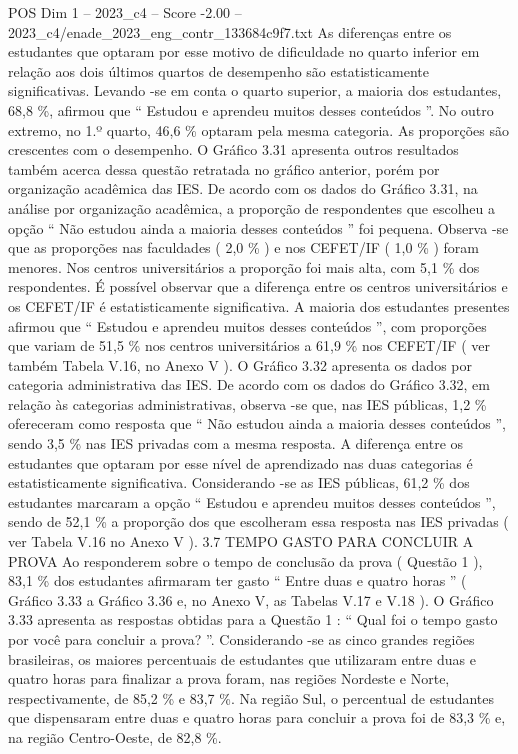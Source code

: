 \begin{textsample}{POS Dim 1 – 2023\_c4 – Score -2.00 – 2023\_c4/enade\_2023\_eng\_contr\_133684c9f7.txt}
As diferenças entre os estudantes que optaram por esse motivo de dificuldade no quarto inferior em relação aos dois últimos quartos de desempenho são estatisticamente significativas.
Levando -se em conta o quarto superior, a maioria dos estudantes, 68,8 \%, afirmou que “ Estudou e aprendeu muitos desses conteúdos ”.
No outro extremo, no 1.º quarto, 46,6 \% optaram pela mesma categoria.
As proporções são crescentes com o desempenho.
O Gráfico 3.31 apresenta outros resultados também acerca dessa questão retratada no gráfico anterior, porém por organização acadêmica das IES.
De acordo com os dados do Gráfico 3.31, na análise por organização acadêmica, a proporção de respondentes que escolheu a opção “ Não estudou ainda a maioria desses conteúdos ” foi pequena.
Observa -se que as proporções nas faculdades ( 2,0 \% ) e nos CEFET/IF ( 1,0 \% ) foram menores.
Nos centros universitários a proporção foi mais alta, com 5,1 \% dos respondentes.
É possível observar que a diferença entre os centros universitários e os CEFET/IF é estatisticamente significativa.
A maioria dos estudantes presentes afirmou que “ Estudou e aprendeu muitos desses conteúdos ”, com proporções que variam de 51,5 \% nos centros universitários a 61,9 \% nos CEFET/IF ( ver também Tabela V.16, no Anexo V ).
O Gráfico 3.32 apresenta os dados por categoria administrativa das IES.
De acordo com os dados do Gráfico 3.32, em relação às categorias administrativas, observa -se que, nas IES públicas, 1,2 \% ofereceram como resposta que “ Não estudou ainda a maioria desses conteúdos ”, sendo 3,5 \% nas IES privadas com a mesma resposta.
A diferença entre os estudantes que optaram por esse nível de aprendizado nas duas categorias é estatisticamente significativa.
Considerando -se as IES públicas, 61,2 \% dos estudantes marcaram a opção “ Estudou e aprendeu muitos desses conteúdos ”, sendo de 52,1 \% a proporção dos que escolheram essa resposta nas IES privadas ( ver Tabela V.16 no Anexo V ). 3.7 TEMPO GASTO PARA CONCLUIR A PROVA Ao responderem sobre o tempo de conclusão da prova ( Questão 1 ), 83,1 \% dos estudantes afirmaram ter gasto “ Entre duas e quatro horas ” ( Gráfico 3.33 a Gráfico 3.36 e, no Anexo V, as Tabelas V.17 e V.18 ).
O Gráfico 3.33 apresenta as respostas obtidas para a Questão 1 : “ Qual foi o tempo gasto por você para concluir a prova? ”.
Considerando -se as cinco grandes regiões brasileiras, os maiores percentuais de estudantes que utilizaram entre duas e quatro horas para finalizar a prova foram, nas regiões Nordeste e Norte, respectivamente, de 85,2 \% e 83,7 \%.
Na região Sul, o percentual de estudantes que dispensaram entre duas e quatro horas para concluir a prova foi de 83,3 \% e, na região Centro-Oeste, de 82,8 \%.

\end{textsample}
